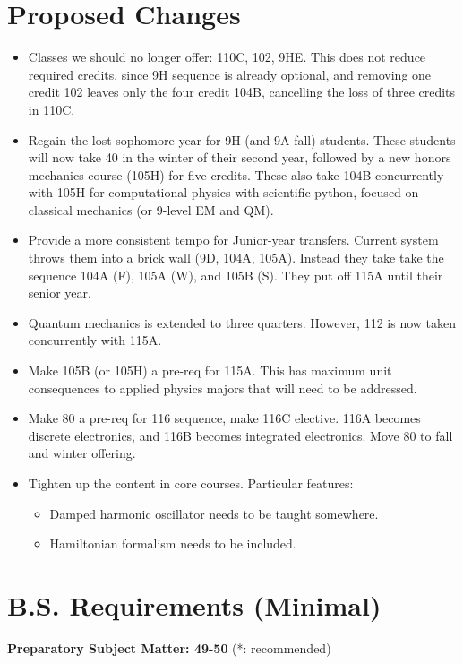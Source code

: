 \documentclass[12pt]{article}
\begin{document}
\section{Proposed  Changes}

\begin{itemize}
\item Classes we should no longer offer:  110C, 102, 9HE.  This does not reduce required credits, since 9H sequence is already optional, and removing one credit 102 leaves only the four credit 104B, cancelling the loss of three credits in 110C.

\item Regain the lost sophomore year for 9H (and 9A fall) students.  These students will now take 40 in the winter of their second year, followed by a new honors mechanics course (105H) for five credits.  These also take 104B concurrently with 105H for computational physics with scientific python, focused on classical mechanics (or 9-level EM and QM).

\item Provide a more consistent tempo for Junior-year transfers.  Current system throws them into a brick wall (9D, 104A, 105A).  Instead they take
take the sequence 104A (F), 105A (W), and 105B (S).  They put off 115A until their senior year.

\item Quantum mechanics is extended to three quarters.  However, 112 is now taken concurrently with 115A.

\item Make 105B (or 105H) a pre-req for 115A.  This has maximum unit consequences to applied physics majors that will need to be addressed.

\item Make 80 a pre-req for 116 sequence, make 116C elective. 116A becomes discrete electronics, and 116B becomes integrated electronics.  Move 80 to fall and winter offering.

\item Tighten up the content in core courses.  Particular features:
\begin{itemize}
\item Damped harmonic oscillator needs to be taught somewhere.
\item Hamiltonian formalism needs to be included.
\end{itemize}
\end{itemize}
\newpage

\section{B.S. Requirements (Minimal)}
\noindent
{\bf Preparatory Subject Matter: 49-50} (*: recommended)\\ \vskip -0.25cm
\end{document}
